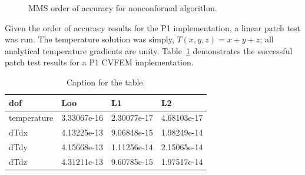 \begin{figure}
  \centering
  \vspace{0.1in}
  \caption{MMS order of accuracy for nonconformal algorithm.}
  \label{fig:laplaceNCOC}
\end{figure}

Given the order of accuracy results for the P1 implementation, a linear patch test was run. The temperature 
solution was simply, $T(x,y,z) = x + y + z$; all analytical temperature gradients are unity. Table~\ref{tab:linearPatch} 
demonstrates the successful patch test results for a P1 CVFEM implementation.

\begin{table}[h!]
  \centering
  \caption{Caption for the table.}
  \label{tab:linearPatch}
  \begin{tabular}{llll}
    dof & Loo & L1 & L2 \\
    \hline
    temperature & 3.33067e-16 & 2.30077e-17 & 4.68103e-17\\
     dTdx & 4.13225e-13 & 9.06848e-15 & 1.98249e-14\\
     dTdy & 4.15668e-13 & 1.11256e-14 & 2.15065e-14\\
     dTdz & 4.31211e-13 & 9.60785e-15 & 1.97517e-14
  \end{tabular}
\end{table}

 
